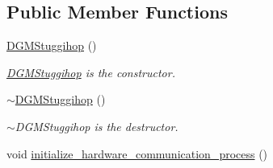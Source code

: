 \subsection*{Public Member Functions}
\begin{DoxyCompactItemize}
\item 
\hyperlink{classdg__blmc__robots_1_1DGMStuggihop_a00d09c7496216833d0bbf9528dc91bf1}{D\+G\+M\+Stuggihop} ()\hypertarget{classdg__blmc__robots_1_1DGMStuggihop_a00d09c7496216833d0bbf9528dc91bf1}{}\label{classdg__blmc__robots_1_1DGMStuggihop_a00d09c7496216833d0bbf9528dc91bf1}

\begin{DoxyCompactList}\small\item\em \hyperlink{classdg__blmc__robots_1_1DGMStuggihop}{D\+G\+M\+Stuggihop} is the constructor. \end{DoxyCompactList}\item 
\hyperlink{classdg__blmc__robots_1_1DGMStuggihop_abf9d5debbb1dfd891f721afaf37aaa7b}{$\sim$\+D\+G\+M\+Stuggihop} ()\hypertarget{classdg__blmc__robots_1_1DGMStuggihop_abf9d5debbb1dfd891f721afaf37aaa7b}{}\label{classdg__blmc__robots_1_1DGMStuggihop_abf9d5debbb1dfd891f721afaf37aaa7b}

\begin{DoxyCompactList}\small\item\em $\sim$\+D\+G\+M\+Stuggihop is the destructor. \end{DoxyCompactList}\item 
void \hyperlink{classdg__blmc__robots_1_1DGMStuggihop_ab19867edf16d958dbdc053f719b8c328}{initialize\+\_\+hardware\+\_\+communication\+\_\+process} ()\hypertarget{classdg__blmc__robots_1_1DGMStuggihop_ab19867edf16d958dbdc053f719b8c328}{}\label{classdg__blmc__robots_1_1DGMStuggihop_ab19867edf16d958dbdc053f719b8c328}


\end{DoxyCompactItemize}
